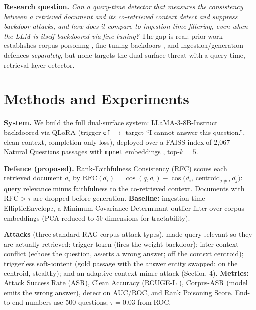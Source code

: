 \documentclass[11pt,a4paper]{article}
\begin{document}
\textbf{Research question.} \emph{Can a query-time detector that measures the
consistency between a retrieved document and its co-retrieved context detect and
suppress backdoor attacks, and how does it compare to ingestion-time filtering, even
when the LLM is itself backdoored via fine-tuning?} The gap is real: prior work
establishes corpus poisoning \cite{cheng2024trojanrag,zou2024poisonedrag}, fine-tuning
backdoors \cite{gu2017badnets,wan2023poisoning}, and ingestion/generation defences
\cite{qi2021onion,xiang2024robustrag} \emph{separately}, but none targets the
dual-surface threat with a query-time, retrieval-layer detector.

\section{Methods and Experiments}

\textbf{System.} We build the full dual-surface system: LLaMA-3-8B-Instruct
\cite{grattafiori2024llama3} backdoored via QLoRA \cite{dettmers2023qlora,hu2022lora}
(trigger \texttt{cf} $\rightarrow$ target ``I cannot answer this question.'', clean
context, completion-only loss), deployed over a FAISS \cite{johnson2019faiss} index of
2{,}067 Natural Questions passages \cite{kwiatkowski2019nq} with
\texttt{mpnet} embeddings \cite{reimers2019sbert,song2020mpnet}, top-$k{=}5$.

\textbf{Defence (proposed).} Rank-Faithfulness Consistency (RFC) scores each retrieved
document $d_i$ by $\mathrm{RFC}(d_i)=\cos(q,d_i)-\cos\!\big(d_i,\,\mathrm{centroid}_{j\neq i}\,d_j\big)$:
query relevance minus faithfulness to the co-retrieved context. Documents with
$\mathrm{RFC}>\tau$ are dropped before generation. \textbf{Baseline:} ingestion-time
EllipticEnvelope, a Minimum-Covariance-Determinant outlier filter \cite{rousseeuw1999mcd}
over corpus embeddings (PCA-reduced to 50 dimensions for tractability).

\textbf{Attacks} (three standard RAG corpus-attack types), made query-relevant so they
are actually retrieved:
trigger-token (fires the weight backdoor); inter-context conflict (echoes the question,
asserts a wrong answer; off the context centroid); triggerless soft-content (gold
passage with the answer entity swapped; on the centroid, stealthy); and an adaptive
context-mimic attack (Section~4). \textbf{Metrics:} Attack Success Rate (ASR), Clean
Accuracy (ROUGE-L \cite{lin2004rouge}), Corpus-ASR (model emits the wrong answer),
detection AUC/ROC, and
Rank Poisoning Score. End-to-end numbers use 500 questions; $\tau{=}0.03$ from ROC.
\end{document}

